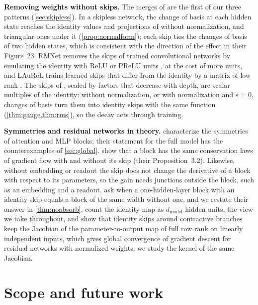 \documentclass[10pt]{article}
\theoremstyle{definition}
\theoremstyle{remark}
\newcommand{\dm}{d_{\mathrm{model}}}
\newcommand{\para}[1]{\smallskip\noindent\textbf{#1}\hspace{0.5em}}
\begin{document}
\para{Removing weights without skips.} The merges of \citet{graef2024tricks} are the first of our three patterns (\cref{sec:skipless}). In a skipless network, the change of basis at each hidden state reaches the identity values and projections of \citet{he2024simplifying} without normalization, and triangular ones under it (\cref{prop:normalform}); each skip ties the changes of basis of two hidden states, which is consistent with the direction of the effect in their Figure~23. RMNet removes the skips of trained convolutional networks by emulating the identity with ReLU or PReLU units \citep{meng2021rmnet}, at the cost of more units, and LAuReL trains learned skips that differ from the identity by a matrix of low rank \citep{menghani2024laurel}. The skips of \citet{zhang2026residual}, scaled by factors that decrease with depth, are scalar multiples of the identity: without normalization, or with normalization and $\varepsilon = 0$, changes of basis turn them into identity skips with the same function (\cref{thm:gauge,thm:rms}), so the decay acts through training.

\para{Symmetries and residual networks in theory.} \citet{wang2025gauge} characterize the symmetries of attention and MLP blocks; their statement for the full model has the counterexamples of \cref{sec:global}. \citet{marcotte2025resnets} show that a block has the same conservation laws of gradient flow with and without its skip (their Proposition~3.2). Likewise, without embedding or readout the skip does not change the derivative of a block with respect to its parameters, so the gain needs junctions outside the block, such as an embedding and a readout. \citet{mijoski2026absorb} ask when a one-hidden-layer block with an identity skip equals a block of the same width without one, and we restate their answer in \cref{thm:noabsorb}. \citet{lin2018resnet} count the identity map as $\dm$ hidden units, the view we take throughout, and \citet{macdonald2023skip} show that identity skips around contractive branches keep the Jacobian of the parameter-to-output map of full row rank on linearly independent inputs, which gives global convergence of gradient descent for residual networks with normalized weights; we study the kernel of the same Jacobian.

\section{Scope and future work}\label{sec:outlook}
\end{document}
